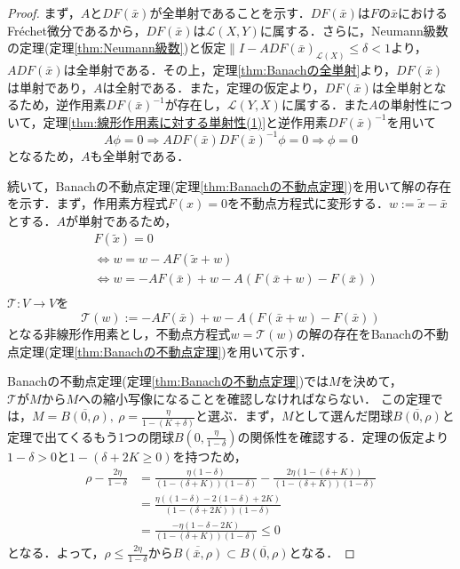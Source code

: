 \documentclass[11pt,a4paper,titlepage]{jsreport}
\theoremstyle{definition}
\begin{document}
\begin{proof}
  まず，$AとDF(\bar{x})$が全単射であることを示す．$DF(\bar{x})$は$Fの\bar{x}$におけるFr\'{e}chet微分であるから，$DF(\bar{x})$は$\mathcal{L}(X,Y)$に属する．さらに，Neumann級数の定理(定理\ref{thm:Neumann級数})と仮定$\|I-ADF(\bar{x})_{\mathcal{L}(X)}\leq \delta < 1$より，$ADF(\bar{x})$は全単射である．その上，定理\ref{thm:Banachの全単射}より，$DF(\bar{x})$は単射であり，$A$は全射である．また，定理の仮定より，$DF(\bar{x})$は全単射となるため，逆作用素$DF(\bar{x})^{-1}$が存在し，$\mathcal{L}(Y,X)$に属する．また$A$の単射性について，定理\ref{thm:線形作用素に対する単射性(1)}と逆作用素$DF(\bar{x})^{-1}$を用いて
  \begin{equation*}
    A\phi = 0 \Rightarrow ADF(\bar{x}) DF(\bar{x})^{-1}\phi = 0 \Rightarrow \phi = 0
  \end{equation*}
  となるため，$A$も全単射である．

  続いて，Banachの不動点定理(定理\ref{thm:Banachの不動点定理})を用いて解の存在を示す．まず，作用素方程式$F(x)=0$を不動点方程式に変形する．$w:=\tilde{x}-\bar{x}$とする．$A$が単射であるため，
  \begin{align*}
     & F(\tilde{x})=0                                                    \\
     & \Leftrightarrow w = w-AF(\tilde{x} + w)                           \\
     & \Leftrightarrow w = -AF(\bar{x}) + w - A(F(\bar{x}+w)-F(\bar{x})) \\
  \end{align*}
  $\mathcal{T}: V \rightarrow V$を
  \begin{equation*}
    \mathcal{T}(w) := -AF(\bar{x}) + w - A(F(\bar{x}+w)-F(\bar{x}))
  \end{equation*}
  となる非線形作用素とし，不動点方程式$w=\mathcal{T}(w)$の解の存在をBanachの不動点定理(定理\ref{thm:Banachの不動点定理})を用いて示す．

  Banachの不動点定理(定理\ref{thm:Banachの不動点定理})では$M$を決めて，$\mathcal{T}がMからMへ$の縮小写像になることを確認しなければならない．
  この定理では，$M=\overline{B(0,\rho)},\ \rho = \frac{\eta}{1-(K+\delta)}$と選ぶ．まず，$M$として選んだ閉球$\overline{B(0,\rho)}$と定理で出てくるもう1つの閉球$B\left(0, \frac{\eta}{1-\delta}\right)$の関係性を確認する．定理の仮定より$1-\delta>0$と$1-\left(\delta + 2K\geq 0\right)$を持つため，
  \begin{align*}
    \rho - \frac{2\eta}{1-\delta} & = \frac{\eta(1-\delta)}{(1-(\delta+K))(1-\delta)}-\frac{2\eta(1-(\delta +K))}{(1-(\delta+K))(1-\delta)} \\
                                  & = \frac{\eta((1-\delta)-2(1-\delta)+2K)}{(1-(\delta+2K))(1-\delta)}                                     \\
                                  & = \frac{-\eta(1-\delta-2K)}{(1-(\delta+K))(1-\delta)}
    \leq 0
  \end{align*}
  となる．よって，$\rho\leq\frac{2\eta}{1-\delta}$から$\overline{B(\bar{x},\rho)}\subset \overline{B\left(0,\rho\right)}$となる．


\end{proof}
\end{document}
